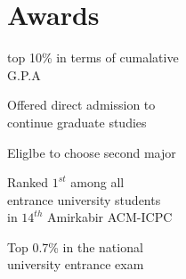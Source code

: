 \documentclass[]{deedy-resume-openfont}
\begin{document}
\begin{minipage}[t]{0.33\textwidth}
\section{Awards}
    \vspace{\topsep} %
\begin{tightemize}
\item top 10\% in terms of cumalative \\ G.P.A
\item Offered direct admission to \\ continue graduate studies
\item Eliglbe to choose second major
\item Ranked $1^{st}$ among all \\ entrance university students \\
    in ${14^{th}}$ Amirkabir ACM-ICPC
\item Top 0.7\% in the national \\university entrance exam
\end{tightemize}

%
%

\end{minipage}
\hfill
\end{document}
